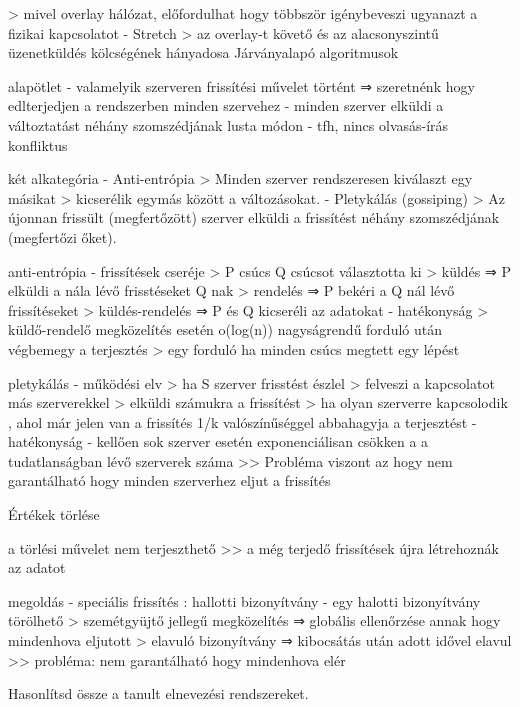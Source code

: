 \documentclass[12pt]{article}
\begin{document}
\begin{description}
        > mivel overlay hálózat, előfordulhat hogy többször igénybeveszi ugyanazt a fizikai kapcsolatot
        - Stretch 
        > az overlay-t követő és az alacsonyszintű üzenetküldés kölcségének hányadosa
        Járványalapó algoritmusok
    \item alapötlet
        - valamelyik szerveren frissítési művelet történt 
        ⇒ szeretnénk hogy edlterjedjen a rendszerben minden szervehez
        - minden szerver elküldi a változtatást néhány szomszédjának lusta módon
        - tfh, nincs olvasás-írás konfliktus
    \item két alkategória
        - Anti-entrópia
        > Minden szerver rendszeresen kiválaszt egy másikat
        > kicserélik egymás között a változásokat.
        - Pletykálás (gossiping)
        > Az újonnan frissült (megfertőzött) szerver elküldi a frissítést néhány szomszédjának (megfertőzi őket).
    \item anti-entrópia
        - frissítések cseréje
        > P csúcs Q csúcsot választotta ki
        > küldés   ⇒ P elküldi a nála lévő frisstéseket Q nak
        > rendelés ⇒ P bekéri a Q nál lévő frissítéseket
        > küldés-rendelés ⇒ P és Q kicseréli az adatokat
        - hatékonyság
        > küldő-rendelő megközelítés esetén o(log(n)) nagyságrendű forduló után végbemegy a terjesztés
        > egy forduló ha minden csúcs megtett egy lépést
    \item pletykálás
        - működési elv
        > ha S szerver frisstést észlel
        > felveszi a kapcsolatot más szerverekkel 
        > elküldi számukra a frissítést
        > ha olyan szerverre kapcsolodik , ahol már jelen van a frissítés 1/k valószínűséggel abbahagyja a terjesztést
        -hatékonyság
        - kellően sok szerver esetén exponenciálisan csökken a a tudatlanságban lévő szerverek száma
        >> Probléma viszont az hogy nem garantálható hogy minden szerverhez eljut a frissítés 
    \item Értékek törlése
    \item a törlési művelet nem terjeszthető
        >> a még terjedő frissítések újra létrehoznák az adatot
    \item megoldás
        - speciális frissítés : hallotti bizonyítvány
        - egy halotti bizonyítvány törölhető
        > szemétgyüjtő jellegű megközelítés ⇒ globális ellenőrzése annak hogy mindenhova eljutott
        > elavuló bizonyítvány ⇒ kibocsátás után adott idővel elavul >> probléma: nem garantálható hogy mindenhova elér
    \item  Hasonlítsd össze a tanult elnevezési rendszereket.

\end{description}
\end{document}
